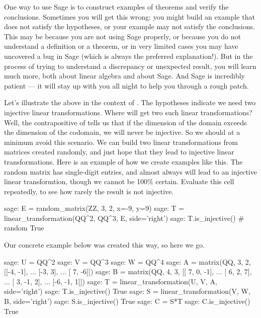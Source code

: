 One way to use Sage is to construct examples of theorems and verify the conclusions.  Sometimes you will get this wrong: you might build an example that does not satisfy the hypotheses, or your example may not satisfy the conclusions.  This may be because you are not using Sage properly, or because you do not understand a definition or a theorem, or in very limited cases you may have uncovered a bug in Sage (which is always the preferred explanation!).  But in the process of trying to understand a discrepancy or unexpected result, you will learn much more, both about linear algebra and about Sage.  And Sage is incredibly patient --- it will stay up with you all night to help you through a rough patch.\par
%
Let's illustrate the above in the context of .  The hypotheses indicate we need two injective linear transformations.  Where will get two such linear transformations?  Well, the contrapositive of  tells us that if the dimension of the domain exceeds the dimension of the codomain, we will never be injective.  So we should at a minimum avoid this scenario.  We can build two linear transformations from matrices created randomly, and just hope that they lead to injective linear transformations.  Here is an example of how we create examples like this.  The random matrix has single-digit entries, and almost always will lead to an injective linear transformtion, though we cannot be 100\% certain.  Evaluate this cell repeatedly, to see how rarely the result is not injective.
%
\begin{sageexample}
sage: E = random_matrix(ZZ, 3, 2, x=-9, y=9)
sage: T = linear_transformation(QQ^2, QQ^3, E, side='right')
sage: T.is_injective()                              # random
True
\end{sageexample}
%
Our concrete example below was created this way, so here we go.
%
\begin{sageexample}
sage: U = QQ^2
sage: V = QQ^3
sage: W = QQ^4
sage: A = matrix(QQ, 3, 2, [[-4, -1],
...                         [-3,  3],
...                         [ 7, -6]])
sage: B = matrix(QQ, 4, 3, [[ 7,  0, -1],
...                         [ 6,  2,  7],
...                         [ 3, -1,  2],
...                         [-6, -1,  1]])
sage: T = linear_transformation(U, V, A, side='right')
sage: T.is_injective()
True
sage: S = linear_transformation(V, W, B, side='right')
sage: S.is_injective()
True
sage: C = S*T
sage: C.is_injective()
True
\end{sageexample}
%
\begin{sageverbatim}
\end{sageverbatim}
%
